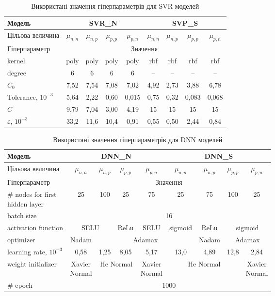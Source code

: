 \documentclass[10pt,a5paper,titlepage,oneside]{book}
\numberwithin{equation}{part}
\begin{document}
\begin{table}[!ht]
\setlength{\tabcolsep}{3pt}
\caption{Використані значення гіперпараметрів для SVR моделей}
\label{tblSVRrez}
\centering
\begin{tabular}{|l|c|c|c|c|c|c|c|c|}
\hline
Модель& \multicolumn{4}{c|}{SVR\_N}& \multicolumn{4}{c|}{SVP\_S} \rule{0pt}{11pt}\\
\hline
Цільова величина&$\mu_{n,n}$&$\mu_{n,p}$&$\mu_{p,p}$&$\mu_{p,n}$&$\mu_{n,n}$&$\mu_{n,p}$&$\mu_{p,p}$&$\mu_{p,n}$\\
\hline
Гіперпараметр&\multicolumn{8}{c|}{Значення}\\
\hline
kernel &poly&poly&poly&poly&rbf&rbf&rbf&rbf\\
\hline
degree&6&6&6&6&--&--&--&--\\
\hline
$C_0$ &7,52&7,54&7,08&7,02&4,92&2,73&3,88&6,78\\
\hline
Tolerance, $10^{-3}$&5,64&2,22&0,60&0,015&0,75&0,32&0,083&0,068\\
\hline
$C$	&9,79&7,04&3,00&4,19&15&15&15&15\\
\hline
$\varepsilon$, $10^{-3}$ &33,2&11,6&10,4&0,91&0,55&0,50&2,44&0,84\\
\hline
\end{tabular}
\end{table}

\begin{table}[!ht]
\setlength{\tabcolsep}{1pt}
\caption{Використані значення гіперпараметрів для DNN моделей}
\label{tblDNNrez}
\centering
\begin{tabular}{|l|c|c|c|c|c|c|c|c|}
\hline
Модель& \multicolumn{4}{c|}{DNN\_N}& \multicolumn{4}{c|}{DNN\_S} \rule{0pt}{11pt}\\
\hline
Цільова величина&$\mu_{n,n}$&$\mu_{n,p}$&$\mu_{p,p}$&$\mu_{p,n}$&$\mu_{n,n}$&$\mu_{n,p}$&$\mu_{p,p}$&$\mu_{p,n}$\\
\hline
Гіперпараметр&\multicolumn{8}{c|}{Значення}\\
\hline
\makecell{\# nodes for first \\hidden layer} &25&100&25&75&25&75&100&25\\
\hline
batch size&\multicolumn{8}{c|}{16}\\
\hline
activation function &\multicolumn{2}{c|}{SELU}&ReLu&SELU&sigmoid&ReLu&\multicolumn{2}{c|}{sigmoid}\\
\hline
optimizer	&Nadam&\multicolumn{4}{c|}{Adamax}&Nadam&\multicolumn{2}{c|}{Adamax}\\
\hline
learning rate, $10^{-3}$	&0,58&1,25&8,05&5,17&13,0&4,89&12,8&2,84\\
\hline
weight initializer &\makecell{Xavier \\Normal}&\multicolumn{2}{c|}{He Normal}&\makecell{Xavier \\Normal}&\multicolumn{3}{c|}{He Normal}&\makecell{Xavier \\Normal}\\
\hline
\# epoch &\multicolumn{8}{c|}{1000}\\
\hline
\end{tabular}
\end{table}
\end{document}
